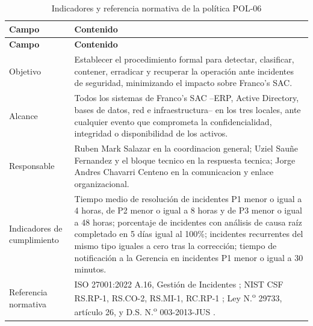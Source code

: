 \documentclass[11pt, a4paper, oneside]{report}
\begin{document}
\begin{xltabular}{\textwidth}{@{}|L{2.6cm}|X|@{}}
\caption{Indicadores y referencia normativa de la política POL-06}
\label{tab:pol06_complemento} \\

\parbox[c][1.1cm][c]{\linewidth}{\centering\color{white}\bfseries\small Campo} &
\parbox[c][1.1cm][c]{\linewidth}{\centering\color{white}\bfseries\small Contenido} \\ \hline
\endfirsthead

\parbox[c][1.1cm][c]{\linewidth}{\centering\color{white}\bfseries\small Campo} &
\parbox[c][1.1cm][c]{\linewidth}{\centering\color{white}\bfseries\small Contenido} \\ \hline
\endhead

\hline
\endfoot

{\small Objetivo} & {\small Establecer el procedimiento formal para detectar, clasificar, contener, erradicar y recuperar la operación ante incidentes de seguridad, minimizando el impacto sobre Franco's SAC.} \\ \hline

{\small Alcance} & {\small Todos los sistemas de Franco's SAC --ERP, Active Directory, bases de datos, red e infraestructura-- en los tres locales, ante cualquier evento que comprometa la confidencialidad, integridad o disponibilidad de los activos.} \\ \hline

{\small Responsable} & {\small Ruben Mark Salazar en la coordinacion general; Uziel Sauñe Fernandez y el bloque tecnico en la respuesta tecnica; Jorge Andres Chavarri Centeno en la comunicacion y enlace organizacional.} \\ \hline

{\small Indicadores de cumplimiento} & {\small Tiempo medio de resolución de incidentes P1 menor o igual a 4 horas, de P2 menor o igual a 8 horas y de P3 menor o igual a 48 horas; porcentaje de incidentes con análisis de causa raíz completado en 5 días igual al 100\%; incidentes recurrentes del mismo tipo iguales a cero tras la corrección; tiempo de notificación a la Gerencia en incidentes P1 menor o igual a 30 minutos.} \\ \hline

{\small Referencia normativa} & {\small ISO 27001:2022 A.16, Gestión de Incidentes \citep{iso27001}; NIST CSF RS.RP-1, RS.CO-2, RS.MI-1, RC.RP-1 \citep{nistcsf}; Ley N.\textsuperscript{o} 29733, artículo 26, y D.S. N.\textsuperscript{o} 003-2013-JUS \citep{ds0032013jus}.} \\ \hline

\end{xltabular}
\end{document}
